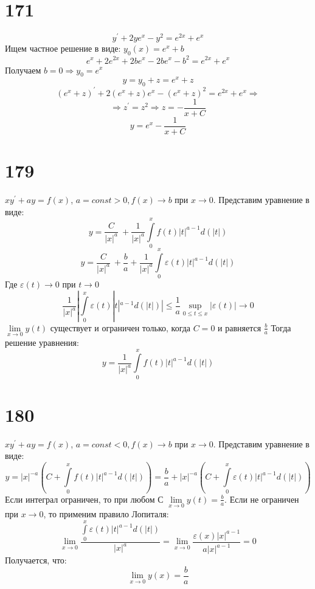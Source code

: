 \documentclass[a4paper,12pt]{article}
\begin{document}
\section{171}
\[y^{'} + 2ye^x - y^2 = e^{2x} +e^x\]
Ищем частное решение в виде: $y_0(x) = e^x + b$ \newline
\[e^x +2e^{2x} + 2be^x - 2be^x - b^2 = e^{2x} +e^x\] \newline
Получаем $b = 0 \Rightarrow y_0 = e^x$
\[y = y_0 + z = e^x + z\]
\[(e^x + z)^{'} + 2(e^x + z)e^x - (e^x + z)^2 = e^{2x}  + e^x \Rightarrow\]
\[\Rightarrow z^{'} = z^2 \Rightarrow z = -\frac{1}{x + C}\]
\[y = e^x - \frac{1}{x + C}\]


\section{179}
$xy^{'} + ay = f(x)$, $a = const > 0, f(x) \rightarrow b$ при $x \rightarrow 0$. \newline
Представим уравнение в виде: \newline
\[y = \frac{C}{|x|^a}\ + \frac{1}{|x|^a}\int\limits_{0}^{x}f(t)|t|^{a-1}d(|t|)\]
\[y = \frac{C}{|x|^a}\ + \frac{b}{a} + \frac{1}{|x|^a}\int\limits_{0}^x\varepsilon(t)|t|^{a-1}d(|t|)\]
Где $\varepsilon(t)\rightarrow0$ при $t\rightarrow0$
\[\frac{1}{|x|^a}|\int\limits_{0}^x\varepsilon(t)|t|^{a-1}d(|t|)| \le \frac{1}{a}\sup_{0\le t\le x}|\varepsilon(t)| \rightarrow 0\]
 $\underset{x \rightarrow 0}{\lim}y(t)$ существует и ограничен только, когда $C = 0$ и равняется $\frac{b}{a}$ \newline
Тогда решение уравнения:  \newline
\[y = \frac{1}{|x|^a}\int\limits_{0}^{x}f(t)|t|^{a-1}d(|t|)\]


\section{180}
$xy^{'} + ay = f(x)$, $a = const < 0, f(x) \rightarrow b$ при $x \rightarrow 0$. \newline
Представим уравнение в виде: \newline
\[y = |x|^{-a}( C + \int\limits_{0}^{x}f(t)|t|^{a-1}d(|t|)) = \frac{b}{a} +{|x|^{-a}}( C + \int\limits_{0}^{x}\varepsilon(t)|t|^{a-1}d(|t|))\]
Если интеграл ограничен, то при любом С $\underset{x \rightarrow 0}{\lim}y(t) = \frac{b}{a}$. Если не ограничен при  $x\rightarrow0$, то 
применим правило Лопиталя: \newline
\[ \underset{x \rightarrow 0}{\lim}\frac{\int\limits_{0}^{x}\varepsilon(t)|t|^{a-1}d(|t|)}{|x|^{a}} = 
\underset{x \rightarrow 0}{\lim}\frac{\varepsilon(x)|x|^{a-1}}{a|x|^{a-1}} = 0\]
Получается, что: 
\[\underset{x \rightarrow 0}{\lim}y(x) = \frac{b}{a} \]
\end{document}
